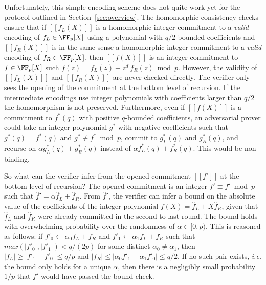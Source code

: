 Unfortunately, this simple encoding scheme does not quite work yet for the protocol outlined in Section~\ref{sec:overview}. The homomorphic consistency checks ensure that if $[\![f_L(X)]\!]$ is a homomorphic integer commitment to a \emph{valid} encoding of $f_L \in \FF_p[X]$ using a polynomial with $q/2$-bounded coefficients and $[\![f_R(X)]\!]$ is in the same sense a homomorphic integer commitment to a \emph{valid} encoding of $f_R \in \FF_p[X]$, then $[\![f(X)]\!]$ is an integer commitment to $f \in \FF_p[X]$ such $f(z) = f_L(z) + z^{d'} f_R(z) \bmod p$. 
However, the validity of $[\![f_L(X)]\!]$ and $[\![f_R(X)]\!]$ are never checked directly. 
The verifier only sees the opening of the commitment at the bottom level of recursion. If the intermediate encodings use integer polynomials with coefficients larger than $q/2$ the homomorphism is not preserved. 
Furthermore, even if $[\![f(X)]\!]$ is a commitment to $f^*(q)$ with positive $q$-bounded coefficients, an adversarial prover could take an integer polynomial $g^*$ with negative coefficients such that $g^*(q) = f^*(q)$ and $g^* \not\equiv f^* \bmod p$, commit to $g^*_L(q)$ and $g^*_R(q)$, and recurse on $\alpha g^*_L(q) + g^*_R(q)$ instead of $\alpha f^*_L(q) + f^*_R(q)$. This would be non-binding. 

So what can the verifier infer from the opened commitment $[\![f']\!]$ at the bottom level of recursion? The opened commitment is an integer $\hat{f}' \equiv f' \bmod p$ such that $\hat{f}' = \alpha \hat{f}_L + \hat{f}_R$. From $\hat{f}'$, the verifier can infer a bound on the absolute value of the coefficients of the integer polynomial $f(X) = \hat{f}_L + X \hat{f}_R$, given that $\hat{f}_L$ and $\hat{f}_R$ were already committed in the second to last round. The bound holds with overwhelming probability over the randomness of $\alpha \in [0,p)$. This is reasoned as follows: if $f'_0 \leftarrow \alpha_0 f_L + f_R$ and $f'_1 \leftarrow \alpha_1 f_L + f_R$ such that $max(|f'_0|, |f'_1|) < q / (2p)$ for some distinct $\alpha_0 \neq \alpha_1$, then $|f_L| \geq |f'_1 - f'_0| \leq q / p$ and $|f_R| \leq |\alpha_0 f'_1 - \alpha_1 f'_0| \leq q/2$. If no such pair exists, \emph{i.e.} the bound only holds for a unique $\alpha$, then there is a negligibly small probability $1/p$ that $f'$ would have passed the bound check.


